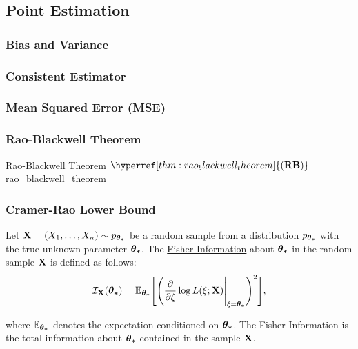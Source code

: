 \subsection{Point Estimation}
\newcommand{\RB}{\hyperref[thm:rao_blackwell_theorem]{(\mathrm{{\bf RB}})}}
\newcommand{\CRLB}{\hyperref[thm:cramer_rao_lowerbound]{(\mathrm{{\bf CRLB}})}}

\subsubsection{Bias and Variance} 


\subsubsection{Consistent Estimator}


\subsubsection{Mean Squared Error (MSE)}

\subsubsection{Rao-Blackwell Theorem}
\begin{theorem}{Rao-Blackwell Theorem $\RB$}{rao_blackwell_theorem}
     
\end{theorem}


\subsubsection{Cramer-Rao Lower Bound}
\begin{definition}
    Let ${\bf X}=(X_1, \dots, X_n) \sim p_{\boldsymbol{\theta_*}}$ be a random sample from a distribution $p_{\boldsymbol{\theta_*}}$ with the true unknown parameter $\boldsymbol{\theta_*}$. The \underline{Fisher Information} about $\boldsymbol{\theta_*}$ in the random sample ${\bf X}$ is defined as follows:
    \begin{equation}
        \mathcal{I}_{\bf X}(\boldsymbol{\theta_*}) = \mathbb{E}_{\boldsymbol{\theta_*}}\Bigg[ 
            \Bigg( 
                \frac{\partial}{\partial\xi}\log L(\xi;{\bf X})\Bigg|_{\xi=\boldsymbol{\theta_*}}
             \Bigg)^2
         \Bigg],
    \end{equation}

    \noindent where $\mathbb{E}_{\boldsymbol{\theta_*}}$ denotes the expectation conditioned on $\boldsymbol{\theta_*}$. The Fisher Information is the total information about $\boldsymbol{\theta_*}$ contained in the sample ${\bf X}$.
\end{definition}

